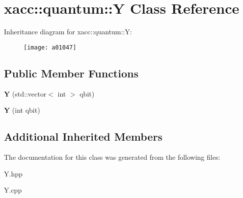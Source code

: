 \hypertarget{a01047}{}\section{xacc\+:\+:quantum\+:\+:Y Class Reference}
\label{a01047}
Inheritance diagram for xacc\+:\+:quantum\+:\+:Y\+:\begin{figure}[H]
\begin{center}
\leavevmode
\texttt{[image: a01047]}
\end{center}
\end{figure}
\subsection*{Public Member Functions}
\begin{DoxyCompactItemize}
\item 
\mbox{\label{a01047_a7959be0aa8221c0b1ba445771f5ecf0a}} 
{\bfseries Y} (std\+::vector$<$ int $>$ qbit)
\item 
\mbox{\label{a01047_aea2b37ac45208cbf6a47e0074e4a9653}} 
{\bfseries Y} (int qbit)
\end{DoxyCompactItemize}
\subsection*{Additional Inherited Members}


The documentation for this class was generated from the following files\+:\begin{DoxyCompactItemize}
\item 
Y.\+hpp\item 
Y.\+cpp\end{DoxyCompactItemize}
